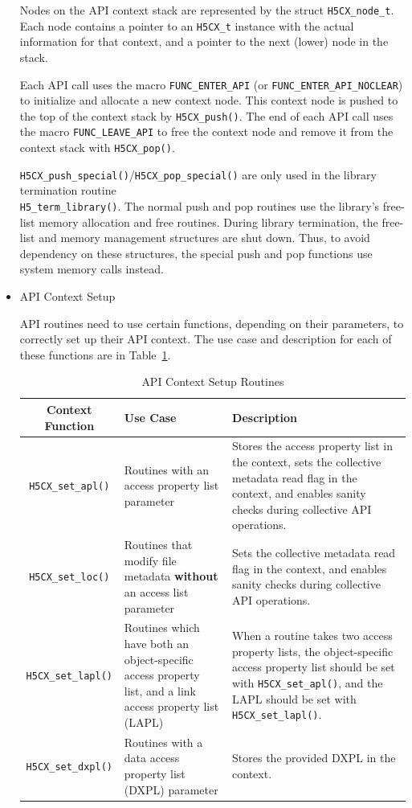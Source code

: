 \begin{itemize}
Nodes on the API context stack are represented by the struct \texttt{H5CX\_node\_t}. Each node contains a pointer to an \texttt{H5CX\_t} instance with the actual information for that context, and a pointer to the next (lower) node in the stack. 

Each API call uses the macro \texttt{FUNC\_ENTER\_API} (or \texttt{FUNC\_ENTER\_API\_NOCLEAR}) to initialize and allocate a new context node. This context node is pushed to the top of the context stack by \texttt{H5CX\_push()}. The end of each API call uses the macro \texttt{FUNC\_LEAVE\_API} to free the context node and remove it from the context stack with \texttt{H5CX\_pop()}.

\texttt{H5CX\_push\_special()}/\texttt{H5CX\_pop\_special()} are only used in the library termination routine \\ \texttt{H5\_term\_library()}. The normal push and pop routines use the library's free-list memory allocation and free routines. During library termination, the free-list and memory management structures are shut down. Thus, to avoid dependency on these structures, the special push and pop functions use system memory calls instead. 

\item API Context Setup

API routines need to use certain functions, depending on their parameters, to correctly set up their API context. The use case and description for each of these functions are in Table~\ref{table:H5CX_functions}.

\begin{table}[h!]
\begin{tabular}{||c|m{}|m{}||}
\hline
\textbf{Context Function} & \textbf{Use Case}  & \textbf{Description} \\  [0.5ex] 
\hline\hline
\texttt{H5CX\_set\_apl()} & Routines with an access property list parameter & Stores the access property list in the context, sets the collective metadata read flag in the context, and enables sanity checks during collective API operations. \\
\hline
\texttt{H5CX\_set\_loc()} & Routines that modify file metadata \textbf{without} an access list parameter & Sets the collective metadata read flag in the context, and enables sanity checks during collective API operations. \\
\hline
\texttt{H5CX\_set\_lapl()} &  Routines which have both an object-specific access property list, and a link access property list (LAPL) & When a routine takes two access property lists, the object-specific access property list should be set with \texttt{H5CX\_set\_apl()}, and the LAPL should be set with \texttt{H5CX\_set\_lapl()}. \\
\hline
\texttt{H5CX\_set\_dxpl()} &  Routines with a data access property list (DXPL) parameter & Stores the provided DXPL in the context. \\
\hline
\end{tabular}
\caption{API Context Setup Routines}
\label{table:H5CX_functions}
\end{table}


\end{itemize}
